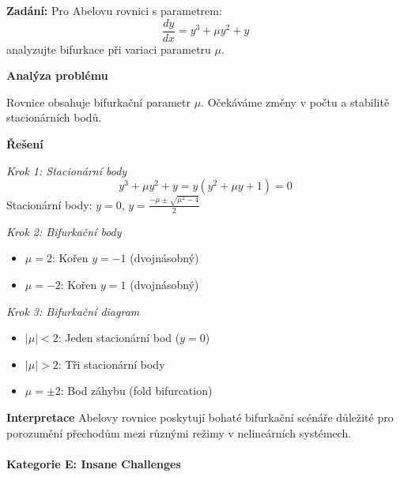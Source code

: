 \begin{example}
\label{ex:bifurkace-abel}

\noindent\textbf{Zadání:} Pro Abelovu rovnici s parametrem:
\[
\frac{dy}{dx} = y^3 + \mu y^2 + y
\]
analyzujte bifurkace při variaci parametru $\mu$.

\vspace{1.5\baselineskip}

\noindent\textbf{Analýza problému}

Rovnice obsahuje bifurkační parametr $\mu$. Očekáváme změny v počtu a stabilitě stacionárních bodů.

\vspace{1.5\baselineskip}

\noindent\textbf{Řešení}

\noindent\textit{Krok 1: Stacionární body}
\[
y^3 + \mu y^2 + y = y(y^2 + \mu y + 1) = 0
\]
Stacionární body: $y = 0$, $y = \frac{-\mu \pm \sqrt{\mu^2 - 4}}{2}$

\vspace{1\baselineskip}

\noindent\textit{Krok 2: Bifurkační body}
\begin{itemize}
\item $\mu = 2$: Kořen $y = -1$ (dvojnásobný)
\item $\mu = -2$: Kořen $y = 1$ (dvojnásobný)
\end{itemize}

\vspace{1\baselineskip}

\noindent\textit{Krok 3: Bifurkační diagram}
\begin{itemize}
\item $|\mu| < 2$: Jeden stacionární bod ($y = 0$)
\item $|\mu| > 2$: Tři stacionární body
\item $\mu = \pm 2$: Bod záhybu (fold bifurcation)
\end{itemize}

\vspace{1.5\baselineskip}

\noindent\textbf{Interpretace}
Abelovy rovnice poskytují bohaté bifurkační scénáře důležité pro porozumění přechodům mezi různými režimy v nelineárních systémech.

\end{example}

\paragraph*{Kategorie E: Insane Challenges}

